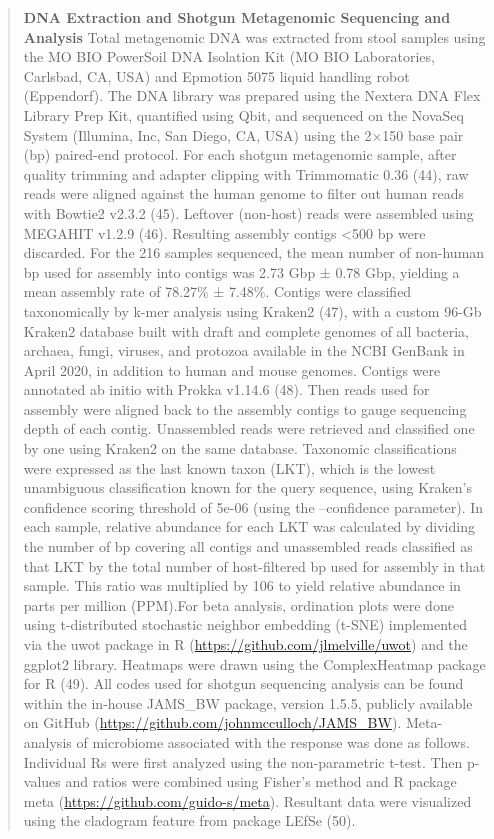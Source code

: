 \documentclass[
]{article}
\begin{document}
\begin{quote}
\textbf{DNA Extraction and Shotgun Metagenomic Sequencing and Analysis}
Total metagenomic DNA was extracted from stool samples using the MO BIO
PowerSoil DNA Isolation Kit (MO BIO Laboratories, Carlsbad, CA, USA) and
Epmotion 5075 liquid handling robot (Eppendorf). The DNA library was
prepared using the Nextera DNA Flex Library Prep Kit, quantified using
Qbit, and sequenced on the NovaSeq System (Illumina, Inc, San Diego, CA,
USA) using the 2×150 base pair (bp) paired-end protocol. For each
shotgun metagenomic sample, after quality trimming and adapter clipping
with Trimmomatic 0.36 (44), raw reads were aligned against the human
genome to filter out human reads with Bowtie2 v2.3.2 (45). Leftover
(non-host) reads were assembled using MEGAHIT v1.2.9 (46). Resulting
assembly contigs \textless500 bp were discarded. For the 216 samples
sequenced, the mean number of non-human bp used for assembly into
contigs was 2.73 Gbp ± 0.78 Gbp, yielding a mean assembly rate of
78.27\% ± 7.48\%. Contigs were classified taxonomically by k-mer
analysis using Kraken2 (47), with a custom 96-Gb Kraken2 database built
with draft and complete genomes of all bacteria, archaea, fungi,
viruses, and protozoa available in the NCBI GenBank in April 2020, in
addition to human and mouse genomes. Contigs were annotated ab initio
with Prokka v1.14.6 (48). Then reads used for assembly were aligned back
to the assembly contigs to gauge sequencing depth of each contig.
Unassembled reads were retrieved and classified one by one using Kraken2
on the same database. Taxonomic classifications were expressed as the
last known taxon (LKT), which is the lowest unambiguous classification
known for the query sequence, using Kraken's confidence scoring
threshold of 5e-06 (using the --confidence parameter). In each sample,
relative abundance for each LKT was calculated by dividing the number of
bp covering all contigs and unassembled reads classified as that LKT by
the total number of host-filtered bp used for assembly in that sample.
This ratio was multiplied by 106 to yield relative abundance in parts
per million (PPM).For beta analysis, ordination plots were done using
t-distributed stochastic neighbor embedding (t-SNE) implemented via the
uwot package in R (\url{https://github.com/jlmelville/uwot}) and the
ggplot2 library. Heatmaps were drawn using the ComplexHeatmap package
for R (49). All codes used for shotgun sequencing analysis can be found
within the in-house JAMS\_BW package, version 1.5.5, publicly available
on GitHub (\url{https://github.com/johnmcculloch/JAMS_BW}).
Meta-analysis of microbiome associated with the response was done as
follows. Individual Rs were first analyzed using the non-parametric
t-test. Then p-values and ratios were combined using Fisher's method and
R package meta (\url{https://github.com/guido-s/meta}). Resultant data
were visualized using the cladogram feature from package LEfSe (50).
\end{quote}
\end{document}

